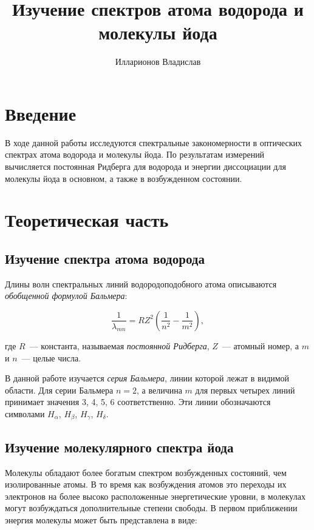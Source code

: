 \documentclass[reprint, nofootinbib, 10pt]{revtex4-2}
\begin{document}
\title{Изучение спектров атома водорода и молекулы йода}
\author{Илларионов Владислав}

\maketitle



\section*{Введение}


В ходе данной работы исследуются спектральные закономерности в оптических спектрах атома
водорода и молекулы йода. По результатам измерений вычисляется постоянная Ридберга для
водорода и энергии диссоциации для молекулы йода в основном, а также в возбужденном состоянии.


\section*{Теоретическая часть}


\subsection*{Изучение спектра атома водорода}

Длины волн спектральных линий водородоподобного атома описываются \textit{обобщенной формулой Бальмера}:

\begin{equation}
	\label{eq:balmer}
	\frac{1}{\lambda_{mn}} = R Z^2 \left( \frac{1}{n^2} - \frac{1}{m^2} \right),
\end{equation}

где $R$~--- константа, называемая \textit{постоянной Ридберга}, $Z$~--- атомный номер,
а $m$ и $n$~--- целые числа.

В данной работе изучается \textit{серия Бальмера}, линии которой лежат в видимой области. Для серии
Бальмера $n=2$, а величина $m$ для первых четырех линий принимает значения 3, 4, 5, 6 соответственно.
Эти линии обозначаются символами $H_\alpha$, $H_\beta$, $H_\gamma$, $H_\delta$.


\subsection*{Изучение молекулярного спектра йода}

Молекулы обладают более богатым спектром возбужденных состояний, чем изолированные атомы.
В то время как возбуждения атомов это переходы их электронов на более высоко расположенные
энергетические уровни, в молекулах могут возбуждаться дополнительные степени свободы.
В первом приближении энергия молекулы может быть представлена в виде:
\end{document}
